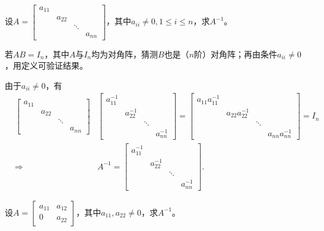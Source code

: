 \begin{eg}
设$A = \begin{bmatrix} a_{11} & & & \\ & a_{22} & & \\ & & \ddots & \\ & & & a_{nn} \end{bmatrix}$，其中$a_{ii} \neq 0, 1 \leqslant i \leqslant n$，求$A^{-1}$。
\end{eg}

\begin{solution}
若$AB = I_n$，其中$A$与$I_n$均为对角阵，猜测$B$也是（$n$阶）对角阵；再由条件$a_{ii}\neq 0$，用定义可验证结果。

由于$a_{ii} \neq 0$，有
\begin{eqnarray*}
& \begin{bmatrix} a_{11} & & & \\ & a_{22} & & \\ & & \ddots & \\ & & & a_{nn} \end{bmatrix} & \begin{bmatrix} a_{11}^{-1} & & & \\ & a_{22}^{-1} & & \\ & & \ddots & \\ & & & a_{nn}^{-1} \end{bmatrix} = \begin{bmatrix} a_{11}a_{11}^{-1} & & & \\ & a_{22}a_{22}^{-1} & & \\ & & \ddots & \\ & & & a_{nn}a_{nn}^{-1} \end{bmatrix} = I_n \\
& \Longrightarrow & A^{-1} = \begin{bmatrix} a_{11}^{-1} & & & \\ & a_{22}^{-1} & & \\ & & \ddots & \\ & & & a_{nn}^{-1} \end{bmatrix}.
\end{eqnarray*}
\end{solution}

\begin{eg}
设$A = \begin{bmatrix} a_{11} & a_{12} \\ 0 & a_{22} \end{bmatrix}$，其中$a_{11}, a_{22} \neq 0$，求$A^{-1}$。
\end{eg}

